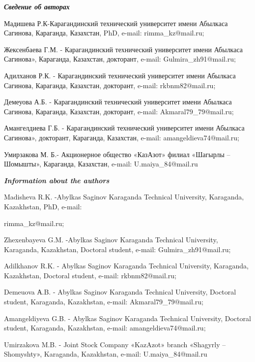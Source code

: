\emph{{\bfseries Сведение об авторах}}

\begin{noparindent}
Мадишева Р.К-Карагандинский технический университет имени Абылкаса
Сагинова, Караганда, Казахстан, PhD, e-mail: rimma\_kz@mail.ru;

Жексенбаева Г.М. - Карагандинский технический университет имени Абылкаса
Сагинова», Караганда, Казахстан, докторант, e-mail:
Gulmira\_zh91@mail.ru;

Адилханов Р.К. - Карагандинский технический университет имени Абылкаса
Сагинова, Караганда, Казахстан, докторант, e-mail: rkbnm82@mail.ru;

Демеуова А.Б. - Карагандинский технический университет имени Абылкаса
Сагинова, Караганда, Казахстан, докторант, e-mail:
Akmaral79\_79@mail.ru;

Амангелдиева Г.Б. - Карагандинский технический университет имени
Абылкаса Сагинова», докторант, Караганда, Казахстан, e-mail:
amangeldieva74@mail.ru;

Умирзакова М. Б.- Акционерное общество «КазАзот» филиал «Шагырлы --
Шомышты», Караганда, Казахстан, e-mail: U.maiya\_84@mail.ru
\end{noparindent}

\emph{{\bfseries Information about the authors}}

\begin{noparindent}
Madisheva R.K. -Abylkas Saginov Karaganda Technical University,
Karaganda, Kazakhstan, PhD, e-mail:

rimma\_kz@mail.ru;

Zhexenbayeva G.M. -Abylkas Saginov Karaganda Technical University,
Karaganda, Kazakhstan, Doctoral student, e-mail: Gulmira\_zh91@mail.ru;

Adilkhanov R.K. - Abylkas Saginov Karaganda Technical University,
Karaganda, Kazakhstan, Doctoral student, e-mail: rkbnm82@mail.ru;

Demeuova А.B. - Abylkas Saginov Karaganda Technical University, Doctoral
student, Karaganda, Kazakhstan, e-mail: Akmaral79\_79@mail.ru;

Amangeldiyeva G.B. - Abylkas Saginov Karaganda Technical University,
Doctoral student, Karaganda, Kazakhstan, e-mail: amangeldieva74@mail.ru;

Umirzakova M.B. - Joint Stock Company «KazAzot» branch «Shagyrly --
Shomyshty», Karaganda, Kazakhstan, e-mail: U.maiya\_84@mail.ru
\end{noparindent}
